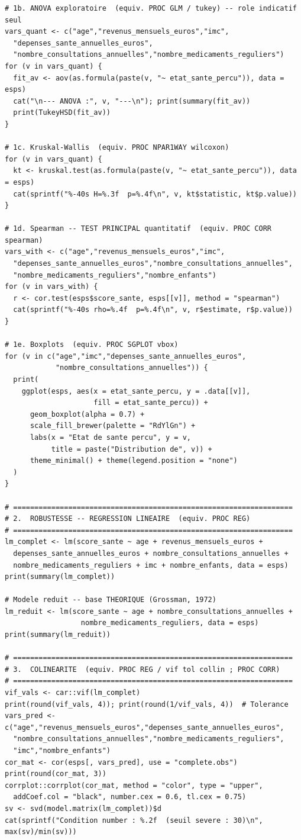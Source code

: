 \documentclass[11pt,a4paper]{memoirerecherche}
\begin{document}
\begin{footnotesize}
\begin{verbatim}
# 1b. ANOVA exploratoire  (equiv. PROC GLM / tukey) -- role indicatif seul
vars_quant <- c("age","revenus_mensuels_euros","imc",
  "depenses_sante_annuelles_euros",
  "nombre_consultations_annuelles","nombre_medicaments_reguliers")
for (v in vars_quant) {
  fit_av <- aov(as.formula(paste(v, "~ etat_sante_percu")), data = esps)
  cat("\n--- ANOVA :", v, "---\n"); print(summary(fit_av))
  print(TukeyHSD(fit_av))
}

# 1c. Kruskal-Wallis  (equiv. PROC NPAR1WAY wilcoxon)
for (v in vars_quant) {
  kt <- kruskal.test(as.formula(paste(v, "~ etat_sante_percu")), data = esps)
  cat(sprintf("%-40s H=%.3f  p=%.4f\n", v, kt$statistic, kt$p.value))
}

# 1d. Spearman -- TEST PRINCIPAL quantitatif  (equiv. PROC CORR spearman)
vars_with <- c("age","revenus_mensuels_euros","imc",
  "depenses_sante_annuelles_euros","nombre_consultations_annuelles",
  "nombre_medicaments_reguliers","nombre_enfants")
for (v in vars_with) {
  r <- cor.test(esps$score_sante, esps[[v]], method = "spearman")
  cat(sprintf("%-40s rho=%.4f  p=%.4f\n", v, r$estimate, r$p.value))
}

# 1e. Boxplots  (equiv. PROC SGPLOT vbox)
for (v in c("age","imc","depenses_sante_annuelles_euros",
            "nombre_consultations_annuelles")) {
  print(
    ggplot(esps, aes(x = etat_sante_percu, y = .data[[v]],
                     fill = etat_sante_percu)) +
      geom_boxplot(alpha = 0.7) +
      scale_fill_brewer(palette = "RdYlGn") +
      labs(x = "Etat de sante percu", y = v,
           title = paste("Distribution de", v)) +
      theme_minimal() + theme(legend.position = "none")
  )
}

# ==================================================================
# 2.  ROBUSTESSE -- REGRESSION LINEAIRE  (equiv. PROC REG)
# ==================================================================
lm_complet <- lm(score_sante ~ age + revenus_mensuels_euros +
  depenses_sante_annuelles_euros + nombre_consultations_annuelles +
  nombre_medicaments_reguliers + imc + nombre_enfants, data = esps)
print(summary(lm_complet))

# Modele reduit -- base THEORIQUE (Grossman, 1972)
lm_reduit <- lm(score_sante ~ age + nombre_consultations_annuelles +
                  nombre_medicaments_reguliers, data = esps)
print(summary(lm_reduit))

# ==================================================================
# 3.  COLINEARITE  (equiv. PROC REG / vif tol collin ; PROC CORR)
# ==================================================================
vif_vals <- car::vif(lm_complet)
print(round(vif_vals, 4)); print(round(1/vif_vals, 4))  # Tolerance
vars_pred <- c("age","revenus_mensuels_euros","depenses_sante_annuelles_euros",
  "nombre_consultations_annuelles","nombre_medicaments_reguliers",
  "imc","nombre_enfants")
cor_mat <- cor(esps[, vars_pred], use = "complete.obs")
print(round(cor_mat, 3))
corrplot::corrplot(cor_mat, method = "color", type = "upper",
  addCoef.col = "black", number.cex = 0.6, tl.cex = 0.75)
sv <- svd(model.matrix(lm_complet))$d
cat(sprintf("Condition number : %.2f  (seuil severe : 30)\n", max(sv)/min(sv)))


\end{verbatim}
\end{footnotesize}
\end{document}
